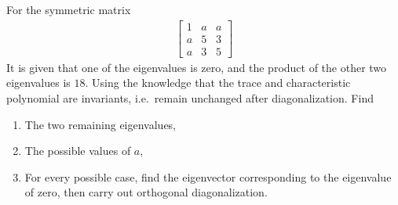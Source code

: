 \begin{Exercise}
For the symmetric matrix 
\begin{align*}
\begin{bmatrix}
1 & a & a\\
a & 5 & 3\\
a & 3 & 5
\end{bmatrix}
\end{align*}
It is given that one of the eigenvalues is zero, and the product of the other two eigenvalues is $18$. Using the knowledge that the trace and characteristic polynomial are invariants, i.e.\ remain unchanged after diagonalization. Find 
\begin{enumerate}[label=(\alph*)]
\item The two remaining eigenvalues,
\item The possible values of $a$,
\item For every possible case, find the eigenvector corresponding to the eigenvalue of zero, then carry out orthogonal diagonalization.
\end{enumerate}
\end{Exercise}
